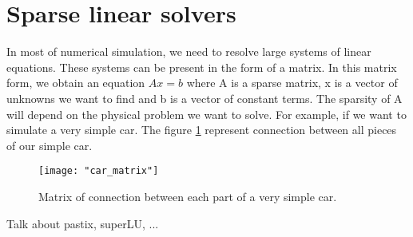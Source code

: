 \section{Sparse linear solvers}
In most of numerical simulation, we need to resolve large systems of linear equations.
%
These systems can be present in the form of a matrix.
%
In this matrix form, we obtain an equation $Ax=b$ where A is a sparse matrix,
x is a vector of unknowns we want to find and b is a vector of constant terms.
%
The sparsity of A will depend on the physical problem we want to solve.
%
For example, if we want to simulate a very simple car.
%
The figure \ref{car_matrix} represent connection between all pieces of our simple car.
%


\begin{figure}[t!]
  \centering
  \texttt{[image: "car\_matrix"]}
  \caption{Matrix of connection between each part of a very simple car.}
  \label{car_matrix}
\end{figure}



Talk about pastix, superLU, ...
